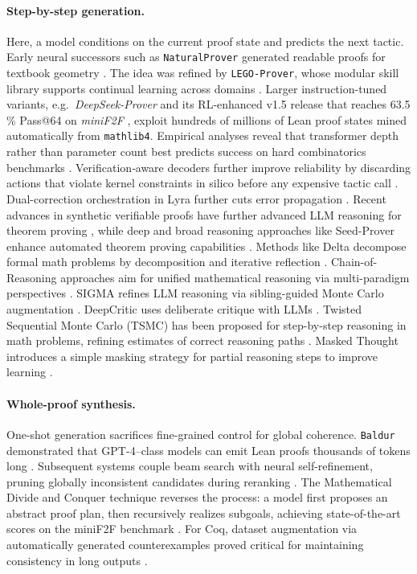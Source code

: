 \documentclass[acmsmall,anonymous]{acmart}
\begin{document}
\paragraph{Step-by-step generation.}
Here, a model conditions on the current proof state and predicts the next tactic.  Early neural successors such as \texttt{NaturalProver} generated readable proofs for textbook geometry \cite{welleck2022naturalprover}.  The idea was refined by \texttt{LEGO-Prover}, whose modular skill library supports continual learning across domains \cite{xin2023lego,xin2023lego}.  Larger instruction-tuned variants, e.g.\  \emph{DeepSeek-Prover} \cite{xin2024deepseek} and its RL-enhanced v1.5 release that reaches 63.5 \% Pass@64 on \textit{miniF2F} \cite{xin2024deepseek15},  exploit hundreds of millions of Lean proof states mined automatically from \texttt{mathlib4}.  Empirical analyses reveal that transformer depth rather than parameter count best predicts success on hard combinatorics benchmarks \cite{yang2023steamroller}.  Verification‐aware decoders further improve reliability by discarding actions that violate kernel constraints in silico before any expensive tactic call \cite{cao2024verification}. Dual-correction orchestration in Lyra further cuts error propagation \cite{lee2024lyra}. Recent advances in synthetic verifiable proofs have further advanced LLM reasoning for theorem proving \cite{zhang2025deeptheorem,anonymous2025deeptheorem}, while deep and broad reasoning approaches like Seed-Prover enhance automated theorem proving capabilities \cite{chen2025seedproverdeepbroadreasoning}. Methods like Delta decompose formal math problems by decomposition and iterative reflection \cite{zhou2025delta}. Chain-of-Reasoning approaches aim for unified mathematical reasoning via multi-paradigm perspectives \cite{yu-etal-2025-chain}. SIGMA refines LLM reasoning via sibling-guided Monte Carlo augmentation \cite{ren2025sigma}. DeepCritic uses deliberate critique with LLMs \cite{yang2025deepcritic}. Twisted Sequential Monte Carlo (TSMC) has been proposed for step-by-step reasoning in math problems, refining estimates of correct reasoning paths \cite{feng2024}. Masked Thought introduces a simple masking strategy for partial reasoning steps to improve learning \cite{chen2024a}.

\paragraph{Whole-proof synthesis.}
One-shot generation sacrifices fine-grained control for global coherence.  \texttt{Baldur} demonstrated that GPT-4–class models can emit Lean proofs thousands of tokens long \cite{first2023baldur}.  Subsequent systems couple beam search with neural self-refinement, pruning globally inconsistent candidates during reranking \cite{smith2024linc}.  The Mathematical Divide and Conquer technique reverses the process: a model first proposes an abstract proof plan, then recursively realizes subgoals, achieving state-of-the-art scores on the miniF2F benchmark \cite{srivastava2024mathdivide}.  For Coq, dataset augmentation via automatically generated counterexamples proved critical for maintaining consistency in long outputs \cite{florath2024enhancing}.
\end{document}
